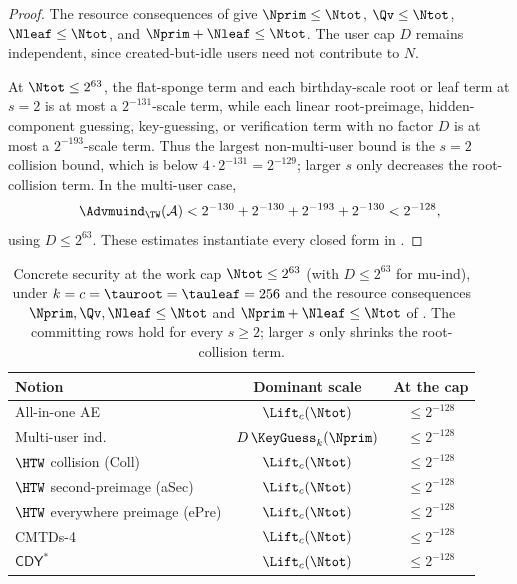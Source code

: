 \begin{proof}
The resource consequences of  give
$\Nprim \leq \Ntot$, $\Qv \leq \Ntot$, $\Nleaf \leq \Ntot$, and
$\Nprim+\Nleaf \leq \Ntot$. The user cap $D$ remains independent, since
created-but-idle users need not contribute to $N$.

At $\Ntot \leq 2^{63}$, the flat-sponge term and each birthday-scale
root or leaf term at $s=2$ is at most a $2^{-131}$-scale term, while each
linear root-preimage, hidden-component guessing, key-guessing, or
verification term with no factor $D$ is at most a $2^{-193}$-scale term.
Thus the largest non-multi-user bound is the $s=2$ collision bound, which is below
$4 \cdot 2^{-131} = 2^{-129}$; larger $s$ only decreases the
root-collision term. In the multi-user case,
\[
  \Advmuind_\TW(\mathcal{A})
  < 2^{-130} + 2^{-130} + 2^{-193} + 2^{-130}
  < 2^{-128},
\]
using $D \leq 2^{63}$. These estimates instantiate every closed form in
.
\end{proof}

\begin{table}[t]
\centering
\caption{Concrete \TW{} security at the work cap $\Ntot \leq 2^{63}$
(with $D \leq 2^{63}$ for mu-ind), under
$k = c = \tauroot = \tauleaf = 256$ and the resource consequences
$\Nprim, \Qv, \Nleaf \leq \Ntot$ and $\Nprim + \Nleaf \leq \Ntot$ of
. The committing
rows hold for every $s \geq 2$; larger $s$ only shrinks the
root-collision term.}
\label{tab:concrete-security}
\begin{tabular}{@{}lcc@{}}
\toprule
Notion & Dominant scale & At the cap \\
\midrule
All-in-one AE & $\Lift_c(\Ntot)$ & $\leq 2^{-128}$ \\
Multi-user ind. & $D\,\KeyGuess_k(\Nprim)$ & $\leq 2^{-128}$ \\
$\HTW$ collision (Coll) & $\Lift_c(\Ntot)$ & $\leq 2^{-128}$ \\
$\HTW$ second-preimage (aSec) & $\Lift_c(\Ntot)$ & $\leq 2^{-128}$ \\
$\HTW$ everywhere preimage (ePre) & $\Lift_c(\Ntot)$ & $\leq 2^{-128}$ \\
CMTDs-4 \cite{BH22} & $\Lift_c(\Ntot)$ & $\leq 2^{-128}$ \\
$\mathsf{CDY}^\ast$ \cite{MLGR23} & $\Lift_c(\Ntot)$ & $\leq 2^{-128}$ \\
\bottomrule
\end{tabular}
\end{table}

